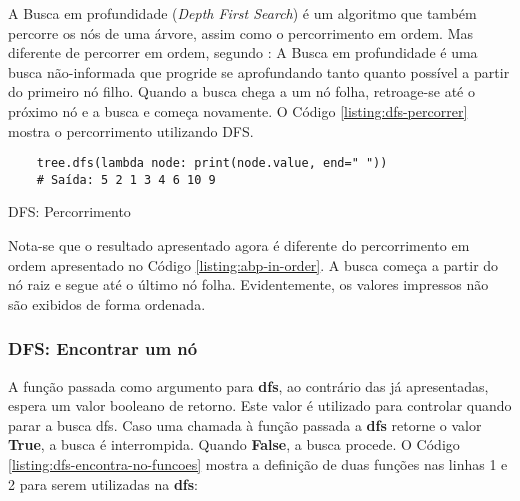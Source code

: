 A Busca em profundidade (\textit{Depth First Search}) é um algoritmo que também percorre os nós de uma árvore, assim como o percorrimento em ordem.
Mas diferente de percorrer em ordem, segundo \citeauthor{wiki_dfs}\cite{wiki_dfs}: A Busca em profundidade é uma busca não-informada que progride se
aprofundando tanto quanto possível a partir do primeiro nó filho. Quando a busca chega a um nó folha, retroage-se até o próximo nó e a busca e começa
novamente.
O Código \ref{listing:dfs-percorrer} mostra o percorrimento utilizando DFS.

\begin{listing}[H]
    \begin{verbatim}
    tree.dfs(lambda node: print(node.value, end=" "))
    # Saída: 5 2 1 3 4 6 10 9 
    \end{verbatim}
    \caption{DFS: Percorrimento}
    \label{listing:dfs-percorrer}
\end{listing}

Nota-se que o resultado apresentado agora é diferente do percorrimento em ordem apresentado no Código \ref{listing:abp-in-order}.
A busca começa a partir do nó raiz e segue até o último nó folha. Evidentemente, os valores impressos não são exibidos de forma ordenada.

\subsubsection{DFS: Encontrar um nó}

A função passada como argumento para \textbf{dfs}, ao contrário das já apresentadas, espera um valor booleano de retorno.
Este valor é utilizado para controlar quando parar a busca dfs. Caso uma chamada à função passada a \textbf{dfs}
retorne o valor \textbf{True}, a busca é interrompida. Quando \textbf{False}, a busca procede.\linebreak
O Código \ref{listing:dfs-encontra-no-funcoes} mostra a definição de duas funções nas linhas 1 e 2 para serem
utilizadas na \textbf{dfs}:

